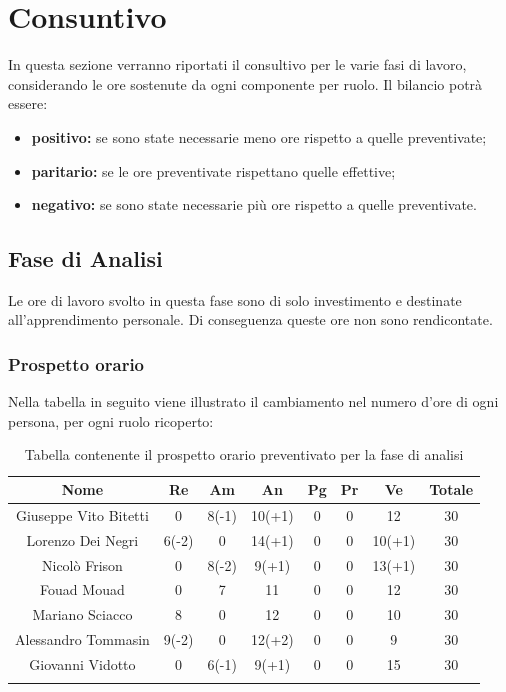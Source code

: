 \section{Consuntivo}
		In questa sezione verranno riportati il consultivo per le varie fasi di lavoro, considerando le ore sostenute da ogni componente per ruolo. Il bilancio potrà essere:
		\begin{itemize}
			\item \textbf{positivo:} se sono state necessarie meno ore rispetto a quelle preventivate;	 
			\item \textbf{paritario:} se le ore preventivate rispettano quelle effettive;	 
			\item \textbf{negativo:} se sono state necessarie più ore rispetto a quelle preventivate.
		\end{itemize}
	\subsection{Fase di Analisi}
		Le ore di lavoro svolto in questa fase sono di solo investimento e destinate all'apprendimento personale. Di conseguenza queste ore non sono rendicontate. 
		\subsubsection{Prospetto orario}
			Nella tabella in seguito viene illustrato il cambiamento nel numero d'ore di ogni persona, per ogni ruolo ricoperto:
			
			\begin{longtable}{|c|c|c|c|c|c|c|c}
				\hline
				\rowcolor{lighter-grayer}
				\textbf{Nome} & \textbf{Re} & \textbf{Am} & \textbf{An} & \textbf{Pg}  & \textbf{Pr}   & \textbf{Ve} & \textbf{Totale} \\
				\hline
				\endfirsthead
				
				\hline
				Giuseppe Vito Bitetti 		& 0 & 8(-1) & 10(+1) & 0 & 0 & 12 & 30\\
				\hline
				\hline
				Lorenzo Dei Negri			 & 6(-2) & 0 & 14(+1) & 0 & 0 & 10(+1) & 30\\
				\hline
				\hline
				Nicolò Frison 					& 0 & 8(-2) & 9(+1) & 0 & 0 & 13(+1) & 30\\
				\hline
				\hline
				Fouad Mouad 				& 0 & 7 & 11 & 0 & 0 & 12 & 30\\
				\hline
				\hline
				Mariano Sciacco 			& 8 & 0 & 12 & 0 & 0 & 10 & 30\\
				\hline
				\hline
				Alessandro Tommasin    & 9(-2) & 0 & 12(+2) & 0 & 0 & 9 & 30\\
				\hline
				\hline
				Giovanni Vidotto 			& 0 & 6(-1) & 9(+1) & 0 & 0 & 15 & 30\\
				\hline 
				\caption{Tabella contenente il prospetto orario preventivato per la fase di analisi}
			\end{longtable}
			\pagebreak	
			
